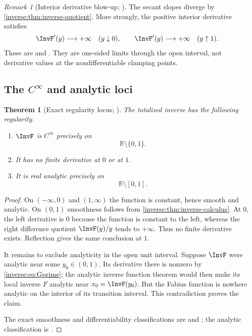 \documentclass[11pt,oneside]{article}
\newtheorem{theorem}{Theorem}[section]
\theoremstyle{definition}
\theoremstyle{remark}
\newtheorem{remark}[remark]{Remark}
\newcommand{\R}{\mathbb R}
\begin{document}
\begin{remark}[Interior derivative blow-up; \Formalized]
The secant slopes diverge by \cref{inverse:thm:inverse-quotient}.  More
strongly, the positive interior derivative satisfies
\[
 \InvF'(y)\longrightarrow+\infty\quad(y\downarrow0),\qquad
 \InvF'(y)\longrightarrow+\infty\quad(y\uparrow1).
\]
These are  and
.  They are one-sided limits
through the open interval, not derivative values at the nondifferentiable
clamping points.
\end{remark}

\subsection{\texorpdfstring{The \(C^\infty\) and analytic loci}{The smooth and analytic loci}}

\begin{theorem}[Exact regularity locus; \Formalized]
\label{inverse:thm:inverse-regularity}
The totalized inverse has the following regularity.
\begin{enumerate}
\item $\InvF$ is $C^\infty$ precisely on
\[
 \R\setminus\{0,1\}.
\]
\item It has no finite derivative at $0$ or at $1$.
\item It is real analytic precisely on
\[
 \R\setminus[0,1].
\]
\end{enumerate}
\end{theorem}

\begin{proof}
On $(-\infty,0)$ and $(1,\infty)$ the function is constant, hence smooth
and analytic.  On $(0,1)$ smoothness follows from
\cref{inverse:thm:inverse-calculus}.  At $0$, the left derivative is $0$ because
the function is constant to the left, whereas the right difference
quotient $\InvF(y)/y$ tends to $+\infty$.  Thus no finite derivative
exists.  Reflection gives the same conclusion at $1$.

It remains to exclude analyticity in the open unit interval.  Suppose
$\InvF$ were analytic near some $y_0\in(0,1)$.  Its derivative there is
nonzero by \eqref{inverse:eq:Gprime}; the analytic inverse function theorem would
then make its local inverse $F$ analytic near $x_0=\InvF(y_0)$.  But the
Fabius function is nowhere analytic on the interior of its transition
interval.  This contradiction proves the claim.

The exact smoothness and differentiability classifications are
 and
; the analytic classification is
.
\end{proof}
\end{document}
